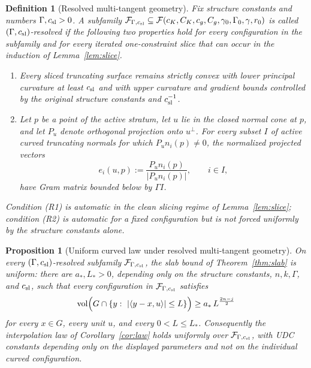 \documentclass[11pt]{article}
\newtheorem{proposition}[theorem]{Proposition}
\newtheorem{definition}[theorem]{Definition}
\newcommand{\vol}{\operatorname{vol}}
\begin{document}
\begin{definition}[Resolved multi-tangent geometry]\label{def:resolved}
Fix structure constants and numbers \(\Gamma,c_{\rm sl}>0\).  A subfamily
\(\mathcal F_{\Gamma,c_{\rm sl}}\subseteq
\mathcal F(c_K,C_K,c_g,C_g,\gamma_0,\Gamma_0,\gamma,r_0)\) is called
\emph{\((\Gamma,c_{\rm sl})\)-resolved} if the following two properties hold
for every configuration in the subfamily and for every iterated one-constraint
slice that can occur in the induction of Lemma~\ref{lem:slice}.
\begin{enumerate}
\item[(R1)] Every sliced truncating surface remains strictly convex with lower
principal curvature at least \(c_{\rm sl}\) and with upper curvature and
gradient bounds controlled by the original structure constants and
\(c_{\rm sl}^{-1}\).
\item[(R2)] Let \(p\) be a point of the active stratum, let \(u\) lie in the
closed normal cone at \(p\), and let \(P_u\) denote orthogonal projection onto
\(u^\perp\).  For every subset \(I\) of active curved truncating normals for
which \(P_un_i(p)\ne0\), the normalized projected vectors
\[
e_i(u,p):=\frac{P_un_i(p)}{|P_un_i(p)|},\qquad i\in I,
\]
have Gram matrix bounded below by \(\Gamma I\).
\end{enumerate}
Condition (R1) is automatic in the clean slicing regime of
Lemma~\ref{lem:slice}; condition (R2) is automatic for a fixed configuration
but is not forced uniformly by the structure constants alone.
\end{definition}

\begin{proposition}[Uniform curved law under resolved multi-tangent geometry]
\label{prop:resolved-uniform}
On every \((\Gamma,c_{\rm sl})\)-resolved subfamily
\(\mathcal F_{\Gamma,c_{\rm sl}}\), the slab bound of
Theorem~\ref{thm:slab} is uniform: there are \(a_*,L_*>0\), depending only on
the structure constants, \(n,k,\Gamma\), and \(c_{\rm sl}\), such that every
configuration in \(\mathcal F_{\Gamma,c_{\rm sl}}\) satisfies
\[
\vol\Bigl(G\cap\{y:\ |\langle y-x,u\rangle|\le L\}\Bigr)
\ge a_*\,L^{\frac{2n-j}2}
\]
for every \(x\in G\), every unit \(u\), and every \(0<L\le L_*\).
Consequently the interpolation law of Corollary~\ref{cor:law} holds uniformly
over \(\mathcal F_{\Gamma,c_{\rm sl}}\), with UDC constants depending only on
the displayed parameters and not on the individual curved configuration.
\end{proposition}
\end{document}
